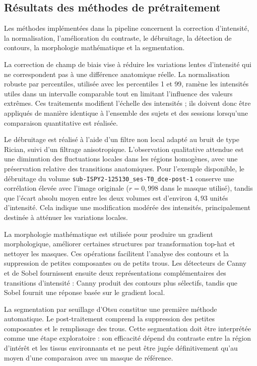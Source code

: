\subsection{Résultats des méthodes de prétraitement}
\label{subsec:resultats_pretraitement}

Les méthodes implémentées dans la pipeline concernent la correction d'intensité, la normalisation, l'amélioration du contraste, le débruitage, la détection de contours, la morphologie mathématique et la segmentation.

La correction de champ de biais vise à réduire les variations lentes d'intensité qui ne correspondent pas à une différence anatomique réelle. La normalisation robuste par percentiles, utilisée avec les percentiles 1 et 99, ramène les intensités utiles dans un intervalle comparable tout en limitant l'influence des valeurs extrêmes. Ces traitements modifient l'échelle des intensités ; ils doivent donc être appliqués de manière identique à l'ensemble des sujets et des sessions lorsqu'une comparaison quantitative est réalisée.

Le débruitage est réalisé à l'aide d'un filtre non local adapté au bruit de type Rician, suivi d'un filtrage anisotropique. L'observation qualitative attendue est une diminution des fluctuations locales dans les régions homogènes, avec une préservation relative des transitions anatomiques. Pour l'exemple disponible, le débruitage du volume \texttt{sub-ISPY2-125130\_}\allowbreak\texttt{ses-T0\_}\allowbreak\texttt{dce-post-1} conserve une corrélation élevée avec l'image originale ($r = 0{,}998$ dans le masque utilisé), tandis que l'écart absolu moyen entre les deux volumes est d'environ $4{,}93$ unités d'intensité. Cela indique une modification modérée des intensités, principalement destinée à atténuer les variations locales.

La morphologie mathématique est utilisée pour produire un gradient morphologique, améliorer certaines structures par transformation top-hat et nettoyer les masques. Ces opérations facilitent l'analyse des contours et la suppression de petites composantes ou de petits trous. Les détecteurs de Canny et de Sobel fournissent ensuite deux représentations complémentaires des transitions d'intensité : Canny produit des contours plus sélectifs, tandis que Sobel fournit une réponse basée sur le gradient local.

La segmentation par seuillage d'Otsu constitue une première méthode automatique. Le post-traitement comprend la suppression des petites composantes et le remplissage des trous. Cette segmentation doit être interprétée comme une étape exploratoire : son efficacité dépend du contraste entre la région d'intérêt et les tissus environnants et ne peut être jugée définitivement qu'au moyen d'une comparaison avec un masque de référence.

